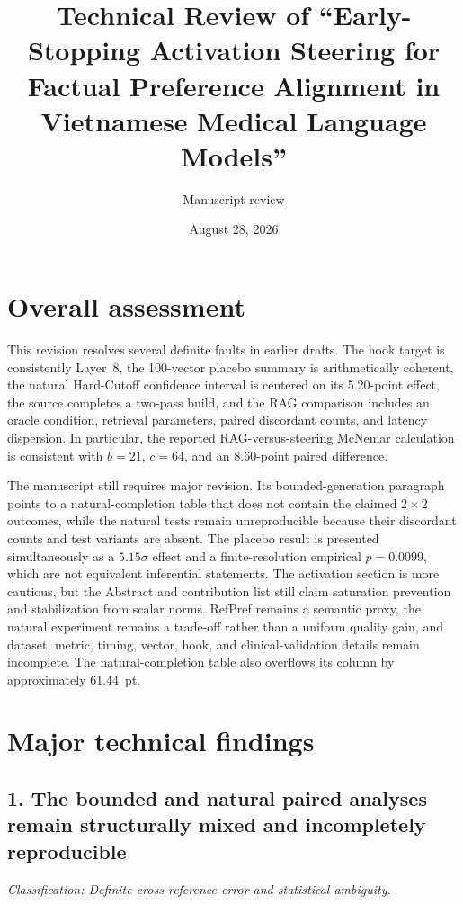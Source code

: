 \documentclass[11pt]{article}
\title{Technical Review of ``Early-Stopping Activation Steering for Factual Preference Alignment in Vietnamese Medical Language Models''}
\author{Manuscript review}
\date{August 28, 2026}
\newcommand{\classification}[1]{\textit{Classification: #1.}}
\begin{document}
\maketitle

\section*{Overall assessment}

This revision resolves several definite faults in earlier drafts.  The hook target is consistently Layer~8, the 100-vector placebo summary is arithmetically coherent, the natural Hard-Cutoff confidence interval is centered on its 5.20-point effect, the source completes a two-pass build, and the RAG comparison includes an oracle condition, retrieval parameters, paired discordant counts, and latency dispersion.  In particular, the reported RAG-versus-steering McNemar calculation is consistent with $b=21$, $c=64$, and an 8.60-point paired difference.

The manuscript still requires major revision.  Its bounded-generation paragraph points to a natural-completion table that does not contain the claimed $2\times2$ outcomes, while the natural tests remain unreproducible because their discordant counts and test variants are absent.  The placebo result is presented simultaneously as a $5.15\sigma$ effect and a finite-resolution empirical $p=0.0099$, which are not equivalent inferential statements.  The activation section is more cautious, but the Abstract and contribution list still claim saturation prevention and stabilization from scalar norms.  RefPref remains a semantic proxy, the natural experiment remains a trade-off rather than a uniform quality gain, and dataset, metric, timing, vector, hook, and clinical-validation details remain incomplete.  The natural-completion table also overflows its column by approximately 61.44~pt.

\section*{Major technical findings}

\subsection*{1. The bounded and natural paired analyses remain structurally mixed and incompletely reproducible}

\classification{Definite cross-reference error and statistical ambiguity}
\end{document}
